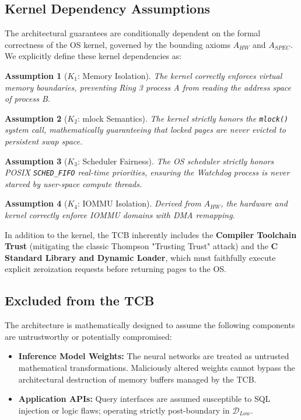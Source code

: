 \documentclass[conference]{IEEEtran}
\newtheorem{assumption}{Assumption}
\begin{document}
\subsection{Kernel Dependency Assumptions}
The architectural guarantees are conditionally dependent on the formal correctness of the OS kernel, governed by the bounding axioms $A_{HW}$ and $A_{SPEC}$. We explicitly define these kernel dependencies as:
\begin{assumption}[$K_1$: Memory Isolation] 
The kernel correctly enforces virtual memory boundaries, preventing Ring 3 process A from reading the address space of process B. 
\end{assumption}
\begin{assumption}[$K_2$: mlock Semantics] 
The kernel strictly honors the \texttt{mlock()} system call, mathematically guaranteeing that locked pages are never evicted to persistent swap space. 
\end{assumption}
\begin{assumption}[$K_3$: Scheduler Fairness] 
The OS scheduler strictly honors POSIX \texttt{SCHED\_FIFO} real-time priorities, ensuring the Watchdog process is never starved by user-space compute threads. 
\end{assumption}
\begin{assumption}[$K_4$: IOMMU Isolation]
Derived from $A_{HW}$, the hardware and kernel correctly enforce IOMMU domains with DMA remapping.
\end{assumption}

In addition to the kernel, the TCB inherently includes the \textbf{Compiler Toolchain Trust} (mitigating the classic Thompson "Trusting Trust" attack) and the \textbf{C Standard Library and Dynamic Loader}, which must faithfully execute explicit zeroization requests before returning pages to the OS.

\subsection{Excluded from the TCB}
The architecture is mathematically designed to assume the following components are untrustworthy or potentially compromised:
\begin{itemize}
    \item \textbf{Inference Model Weights:} The neural networks are treated as untrusted mathematical transformations. Maliciously altered weights cannot bypass the architectural destruction of memory buffers managed by the TCB. 
    \item \textbf{Application APIs:} Query interfaces are assumed susceptible to SQL injection or logic flaws; operating strictly post-boundary in $\mathcal{D}_{Low}$.
\end{itemize}
\end{document}

